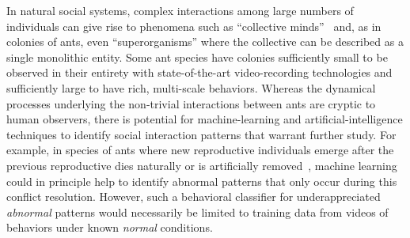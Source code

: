 \documentclass[letterpaper]{article} %
\begin{document}
\noindent In natural social systems, complex interactions among large
numbers of individuals can give rise to phenomena such as ``collective
minds''~\citep{C07} and, as in colonies of ants, even ``superorganisms''
where the collective can be described as a single monolithic entity.
Some ant species have colonies sufficiently small to be observed
in their entirety with state-of-the-art video-recording technologies
and sufficiently large to have rich, multi-scale behaviors. Whereas
the dynamical processes underlying the non-trivial interactions between ants
are cryptic to human observers, there is potential for
machine-learning and artificial-intelligence techniques to identify social
interaction patterns that warrant further study. For example, in species
of ants where new reproductive individuals emerge after
the previous reproductive dies naturally or is artificially
removed~\citep{HHP94, SPSHPL16}, machine learning could in principle
help to identify abnormal patterns that only occur during this conflict
resolution. However, such a behavioral
classifier for underappreciated \emph{abnormal} patterns would
necessarily be limited to training data from videos of behaviors under
known \emph{normal} conditions.
\end{document}
